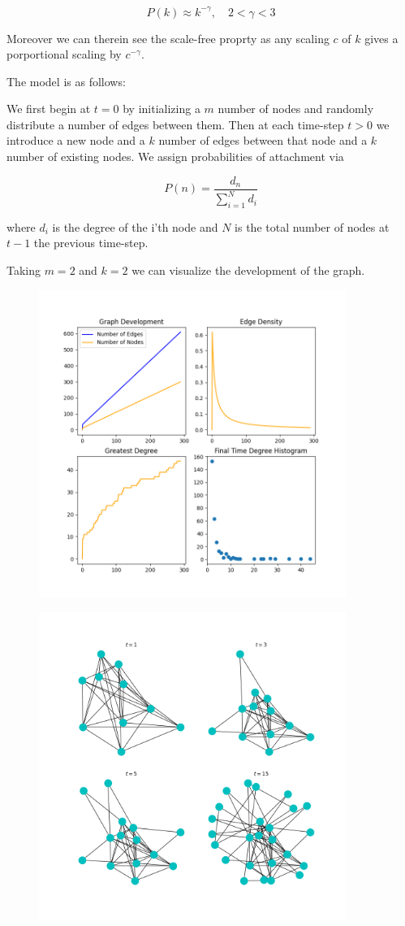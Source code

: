 $$
P(k) \approx k^{-\gamma} , \quad 2< \gamma <3
$$

Moreover we can therein see the scale-free proprty as any scaling $c$ of $k$ gives a porportional scaling
by $c^{-\gamma}$.

The model is as follows: 

We first begin at $t=0$ by initializing a $m$ number of nodes and randomly distribute a number of edges between them.
Then at each time-step $t > 0$ we introduce a new node and a $k$ number of edges between that node 
and a $k$ number of existing nodes. We assign probabilities of attachment via 

$$
P(n) = \frac{d_n}{\sum^{N}_{i=1} d_i}
$$

where $d_i$ is the degree of the i'th node and $N$ is the total number of nodes at $t-1$ the previous time-step.


Taking $m=2$ and $k=2$ we can visualize the development of the graph.

\begin{figure}[h!]
    \includegraphics[width=10cm]{Images/graph_stats_pref_attach_10_2_300-210118-163357.png}
    \centering
\end{figure}

\begin{figure}[h!]
    \includegraphics[width=10cm]{Images/early_graph_data210118-163357.png}
    \centering
\end{figure}

